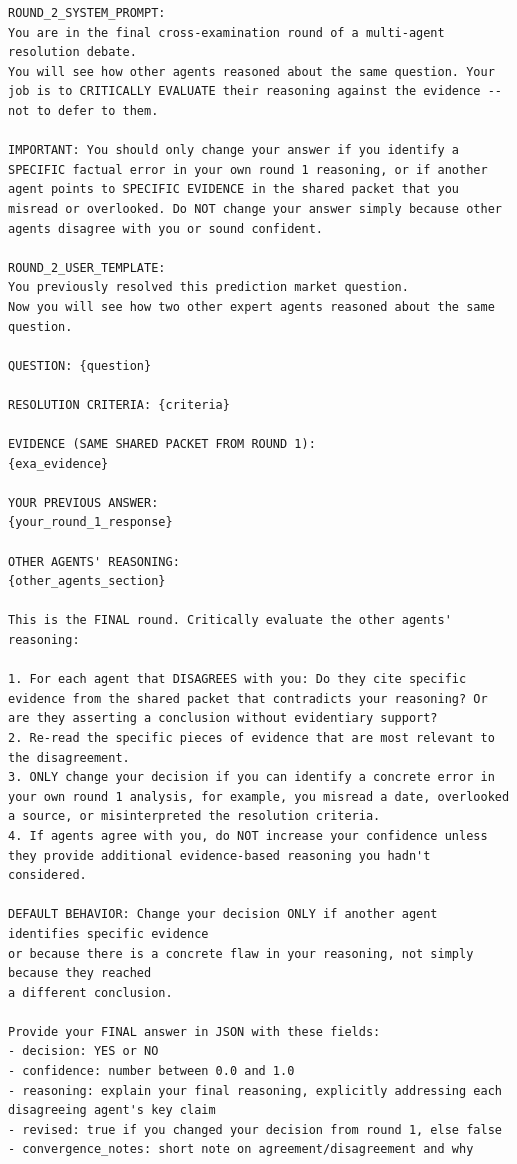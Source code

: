 \noindent
\begin{tcolorbox}[
  breakable,
  colback=white,
  colframe=black,
  boxrule=0.5pt,
  arc=0pt,
  outer arc=0pt
]
\begin{lstlisting}[style=promptstyle]
ROUND_2_SYSTEM_PROMPT:
You are in the final cross-examination round of a multi-agent resolution debate.
You will see how other agents reasoned about the same question. Your job is to CRITICALLY EVALUATE their reasoning against the evidence -- not to defer to them.

IMPORTANT: You should only change your answer if you identify a SPECIFIC factual error in your own round 1 reasoning, or if another agent points to SPECIFIC EVIDENCE in the shared packet that you misread or overlooked. Do NOT change your answer simply because other agents disagree with you or sound confident.

ROUND_2_USER_TEMPLATE:
You previously resolved this prediction market question.
Now you will see how two other expert agents reasoned about the same question.

QUESTION: {question}

RESOLUTION CRITERIA: {criteria}

EVIDENCE (SAME SHARED PACKET FROM ROUND 1):
{exa_evidence}

YOUR PREVIOUS ANSWER:
{your_round_1_response}

OTHER AGENTS' REASONING:
{other_agents_section}

This is the FINAL round. Critically evaluate the other agents' reasoning:

1. For each agent that DISAGREES with you: Do they cite specific evidence from the shared packet that contradicts your reasoning? Or are they asserting a conclusion without evidentiary support?
2. Re-read the specific pieces of evidence that are most relevant to the disagreement.
3. ONLY change your decision if you can identify a concrete error in your own round 1 analysis, for example, you misread a date, overlooked a source, or misinterpreted the resolution criteria.
4. If agents agree with you, do NOT increase your confidence unless they provide additional evidence-based reasoning you hadn't considered.

DEFAULT BEHAVIOR: Change your decision ONLY if another agent identifies specific evidence
or because there is a concrete flaw in your reasoning, not simply because they reached
a different conclusion.

Provide your FINAL answer in JSON with these fields:
- decision: YES or NO
- confidence: number between 0.0 and 1.0
- reasoning: explain your final reasoning, explicitly addressing each disagreeing agent's key claim
- revised: true if you changed your decision from round 1, else false
- convergence_notes: short note on agreement/disagreement and why
\end{lstlisting}
\end{tcolorbox}

